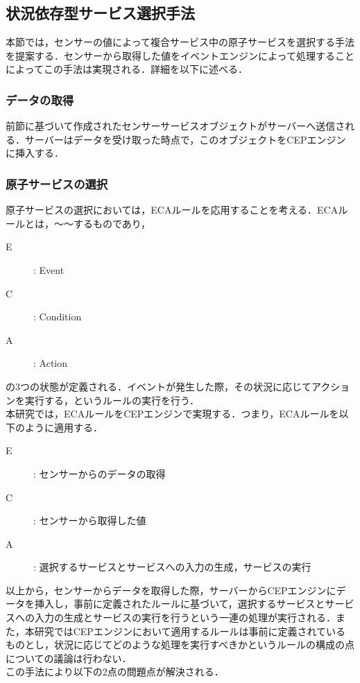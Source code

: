 \documentclass{kuisthesis}			%
\begin{document}
\subsection{状況依存型サービス選択手法}
本節では，センサーの値によって複合サービス中の原子サービスを選択する手法を提案する．センサーから取得した値をイベントエンジンによって処理することによってこの手法は実現される．詳細を以下に述べる．

\subsubsection{データの取得}
前節に基づいて作成されたセンサーサービスオブジェクトがサーバーへ送信される．サーバーはデータを受け取った時点で，このオブジェクトをCEPエンジンに挿入する．

\subsubsection{原子サービスの選択}
原子サービスの選択においては，ECAルールを応用することを考える．ECAルールとは，〜〜するものであり，
\begin{description}
\item[E] : Event
\item[C] : Condition
\item[A] : Action
\end{description}
の3つの状態が定義される．イベントが発生した際，その状況に応じてアクションを実行する，というルールの実行を行う．\\
本研究では，ECAルールをCEPエンジンで実現する．つまり，ECAルールを以下のように適用する．
\begin{description}
\item[E] : センサーからのデータの取得
\item[C] : センサーから取得した値
\item[A] : 選択するサービスとサービスへの入力の生成，サービスの実行
\end{description}
以上から，センサーからデータを取得した際，サーバーからCEPエンジンにデータを挿入し，事前に定義されたルールに基づいて，選択するサービスとサービスへの入力の生成とサービスの実行を行うという一連の処理が実行される．また，本研究ではCEPエンジンにおいて適用するルールは事前に定義されているものとし，状況に応じてどのような処理を実行すべきかというルールの構成の点についての議論は行わない．\\
この手法により以下の2点の問題点が解決される．
\end{document}

